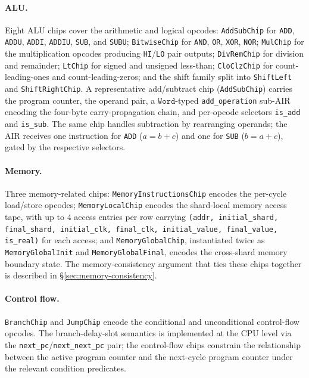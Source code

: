 \paragraph{ALU.} Eight ALU chips cover the arithmetic and logical opcodes:
\texttt{AddSubChip} for \texttt{ADD}, \texttt{ADDU}, \texttt{ADDI}, \texttt{ADDIU}, \texttt{SUB}, and \texttt{SUBU};
\texttt{BitwiseChip} for \texttt{AND}, \texttt{OR}, \texttt{XOR}, \texttt{NOR};
\texttt{MulChip} for the multiplication opcodes producing \texttt{HI}/\texttt{LO} pair outputs;
\texttt{DivRemChip} for division and remainder;
\texttt{LtChip} for signed and unsigned less-than;
\texttt{CloClzChip} for count-leading-ones and count-leading-zeros;
and the shift family split into \texttt{ShiftLeft} and \texttt{ShiftRightChip}. A representative add/subtract chip (\texttt{AddSubChip}) carries the program counter, the operand pair, a $\mathtt{Word}$-typed \texttt{add\_operation} sub-AIR encoding the four-byte carry-propagation chain, and per-opcode selectors \texttt{is\_add} and \texttt{is\_sub}. The same chip handles subtraction by rearranging operands; the AIR receives one instruction for \texttt{ADD} ($a = b + c$) and one for \texttt{SUB} ($b = a + c$), gated by the respective selectors.

\paragraph{Memory.} Three memory-related chips:
\texttt{MemoryInstructionsChip} encodes the per-cycle load/store opcodes;
\texttt{MemoryLocalChip} encodes the shard-local memory access tape, with up to $4$ access entries per row carrying \texttt{(addr, initial\_shard, final\_shard, initial\_clk, final\_clk, initial\_value, final\_value, is\_real)} for each access;
and \texttt{MemoryGlobalChip}, instantiated twice as \texttt{MemoryGlobalInit} and \texttt{MemoryGlobalFinal}, encodes the cross-shard memory boundary state. The memory-consistency argument that ties these chips together is described in \S\ref{sec:memory-consistency}.

\paragraph{Control flow.} \texttt{BranchChip} and \texttt{JumpChip} encode the conditional and unconditional control-flow opcodes. The branch-delay-slot semantics is implemented at the CPU level via the \texttt{next\_pc}/\texttt{next\_next\_pc} pair; the control-flow chips constrain the relationship between the active program counter and the next-cycle program counter under the relevant condition predicates.

